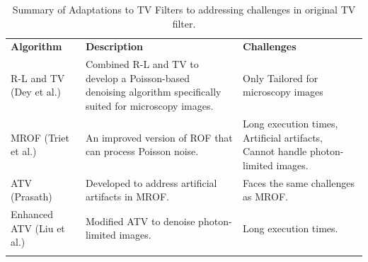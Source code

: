 \begin{center}
\small
\setlength{\arrayrulewidth}{1mm} %
\setlength{\tabcolsep}{6pt} %
\renewcommand{\arraystretch}{1.5} %

\begin{longtable}{ p{}  p{}  p{} }
\rowcolor[HTML]{D3D3D3} 
\textbf{Algorithm} & \textbf{Description} & \textbf{Challenges} \\
\rowcolor[HTML]{FFFFFF} 
\gls{R-L} and \gls{TV} (Dey et al.) \cite{dey_deconvolution_2004} & Combined \gls{R-L} and \gls{TV} to develop a Poisson-based denoising algorithm specifically suited for microscopy images. & Only Tailored for microscopy images \\
\rowcolor[HTML]{F3F3F3} 
\gls{MROF} (Triet et al.) \cite{le_variational_2007} & An improved version of \gls{ROF} that can process Poisson noise. & Long execution times, Artificial artifacts, Cannot handle photon-limited images. \\
\rowcolor[HTML]{FFFFFF} 
\gls{ATV} (Prasath) \cite{prasath_quantum_2017} & Developed to address artificial artifacts in \gls{MROF}. & Faces the same challenges as \gls{MROF}. \\
\rowcolor[HTML]{F3F3F3} 
Enhanced \gls{ATV} (Liu et al.) \cite{liu_poisson_2017} & Modified \gls{ATV} to denoise photon-limited images. & Long execution times. \\
\caption{Summary of Adaptations to \gls{TV} Filters to addressing challenges in original \gls{TV} filter.}
\label{tab:TV}

\end{longtable}
\end{center}



